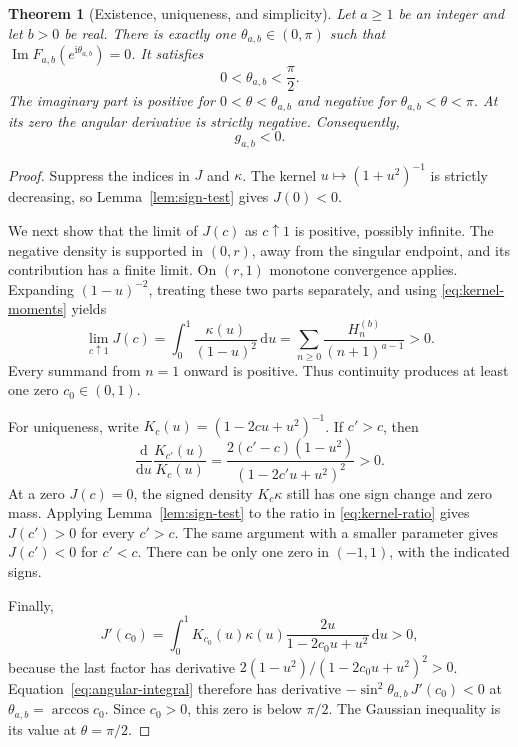 \documentclass[11pt,a4paper]{article}
\numberwithin{equation}{section}
\newtheorem{theorem}{Theorem}[section]
\theoremstyle{definition}
\theoremstyle{remark}
\newcommand{\Imag}{\operatorname{Im}}
\newcommand{\dd}{\,\mathrm{d}}
\newcommand{\ii}{\mathrm{i}}
\begin{document}
\begin{theorem}[Existence, uniqueness, and simplicity]\label{thm:unique-zero}
Let $a\ge1$ be an integer and let $b>0$ be real. There is exactly one
$\theta_{a,b}\in(0,\pi)$ such that
$\Imag F_{a,b}(e^{\ii\theta_{a,b}})=0$. It satisfies
\begin{equation}\label{eq:zero-range}
 0<\theta_{a,b}<\frac\pi2.
\end{equation}
The imaginary part is positive for $0<\theta<\theta_{a,b}$ and negative for $\theta_{a,b}<\theta<\pi$. At its zero the angular derivative is strictly negative. Consequently,
\begin{equation}\label{eq:g-negative}
 g_{a,b}<0.
\end{equation}
\end{theorem}
\begin{proof}
Suppress the indices in $J$ and $\kappa$. The kernel $u\mapsto(1+u^2)^{-1}$ is strictly decreasing, so Lemma~\ref{lem:sign-test} gives $J(0)<0$.

We next show that the limit of $J(c)$ as $c\uparrow1$ is positive, possibly infinite. The negative density is supported in $(0,r)$, away from the singular endpoint, and its contribution has a finite limit. On $(r,1)$ monotone convergence applies. Expanding $(1-u)^{-2}$, treating these two parts separately, and using \eqref{eq:kernel-moments} yields
\begin{equation}\label{eq:J-at-one}
 \lim_{c\uparrow1}J(c)
 =\int_0^1\frac{\kappa(u)}{(1-u)^2}\dd u
 =\sum_{n\ge0}\frac{H_n^{(b)}}{(n+1)^{a-1}}>0.
\end{equation}
Every summand from $n=1$ onward is positive. Thus continuity produces at least one zero $c_0\in(0,1)$.

For uniqueness, write $K_c(u)=(1-2cu+u^2)^{-1}$. If $c'>c$, then
\begin{equation}\label{eq:kernel-ratio}
 \frac{\mathrm d}{\mathrm du}\frac{K_{c'}(u)}{K_c(u)}
 =\frac{2(c'-c)(1-u^2)}{(1-2c'u+u^2)^2}>0.
\end{equation}
At a zero $J(c)=0$, the signed density $K_c\kappa$ still has one sign change and zero mass. Applying Lemma~\ref{lem:sign-test} to the ratio in \eqref{eq:kernel-ratio} gives $J(c')>0$ for every $c'>c$. The same argument with a smaller parameter gives $J(c')<0$ for $c'<c$. There can be only one zero in $(-1,1)$, with the indicated signs.

Finally,
\[
 J'(c_0)=\int_0^1 K_{c_0}(u)\kappa(u)
        \frac{2u}{1-2c_0u+u^2}\dd u>0,
\]
because the last factor has derivative $2(1-u^2)/(1-2c_0u+u^2)^2>0$. Equation~\eqref{eq:angular-integral} therefore has derivative
$-\sin^2\theta_{a,b}\,J'(c_0)<0$ at $\theta_{a,b}=\arccos c_0$. Since $c_0>0$, this zero is below $\pi/2$. The Gaussian inequality is its value at $\theta=\pi/2$.
\end{proof}
\end{document}
